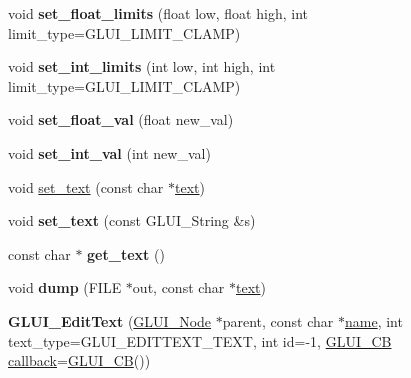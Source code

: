 \begin{DoxyCompactItemize}
\item 
\hypertarget{class_g_l_u_i___edit_text_a3b46c3540795e49983394d3bfdb89fb6}{void {\bfseries set\+\_\+float\+\_\+limits} (float low, float high, int limit\+\_\+type=G\+L\+U\+I\+\_\+\+L\+I\+M\+I\+T\+\_\+\+C\+L\+A\+M\+P)}\label{class_g_l_u_i___edit_text_a3b46c3540795e49983394d3bfdb89fb6}

\item 
\hypertarget{class_g_l_u_i___edit_text_a5761e028dc711efdc234f7211003a500}{void {\bfseries set\+\_\+int\+\_\+limits} (int low, int high, int limit\+\_\+type=G\+L\+U\+I\+\_\+\+L\+I\+M\+I\+T\+\_\+\+C\+L\+A\+M\+P)}\label{class_g_l_u_i___edit_text_a5761e028dc711efdc234f7211003a500}

\item 
\hypertarget{class_g_l_u_i___edit_text_a2c0caddce6e11b8a303c8f247b8fbf0f}{void {\bfseries set\+\_\+float\+\_\+val} (float new\+\_\+val)}\label{class_g_l_u_i___edit_text_a2c0caddce6e11b8a303c8f247b8fbf0f}

\item 
\hypertarget{class_g_l_u_i___edit_text_a230980562d1c49166c7600f1771669bd}{void {\bfseries set\+\_\+int\+\_\+val} (int new\+\_\+val)}\label{class_g_l_u_i___edit_text_a230980562d1c49166c7600f1771669bd}

\item 
void \hyperlink{class_g_l_u_i___edit_text_aa283908f42990f6056298d6381cc19a7}{set\+\_\+text} (const char $\ast$\hyperlink{class_g_l_u_i___control_af0d60e9736f4dbc34e9a536e75876d72}{text})
\item 
\hypertarget{class_g_l_u_i___edit_text_a0f60b8b2a59ecf51b145187483b8deb2}{void {\bfseries set\+\_\+text} (const G\+L\+U\+I\+\_\+\+String \&s)}\label{class_g_l_u_i___edit_text_a0f60b8b2a59ecf51b145187483b8deb2}

\item 
\hypertarget{class_g_l_u_i___edit_text_a621ba269343beeba0346439a43e5e355}{const char $\ast$ {\bfseries get\+\_\+text} ()}\label{class_g_l_u_i___edit_text_a621ba269343beeba0346439a43e5e355}

\item 
\hypertarget{class_g_l_u_i___edit_text_a8c553db0ecb0814a3db0da5bcf630d58}{void {\bfseries dump} (F\+I\+L\+E $\ast$out, const char $\ast$\hyperlink{class_g_l_u_i___control_af0d60e9736f4dbc34e9a536e75876d72}{text})}\label{class_g_l_u_i___edit_text_a8c553db0ecb0814a3db0da5bcf630d58}

\item 
\hypertarget{class_g_l_u_i___edit_text_af99784896490989539ef7638a7fd4e12}{{\bfseries G\+L\+U\+I\+\_\+\+Edit\+Text} (\hyperlink{class_g_l_u_i___node}{G\+L\+U\+I\+\_\+\+Node} $\ast$parent, const char $\ast$\hyperlink{class_g_l_u_i___control_aa95b97d50df45335fc33f0af03958eb3}{name}, int text\+\_\+type=G\+L\+U\+I\+\_\+\+E\+D\+I\+T\+T\+E\+X\+T\+\_\+\+T\+E\+X\+T, int id=-\/1, \hyperlink{class_g_l_u_i___c_b}{G\+L\+U\+I\+\_\+\+C\+B} \hyperlink{class_g_l_u_i___control_a96060fe0cc6d537e736dd6eef78e24ab}{callback}=\hyperlink{class_g_l_u_i___c_b}{G\+L\+U\+I\+\_\+\+C\+B}())}\label{class_g_l_u_i___edit_text_af99784896490989539ef7638a7fd4e12}


\end{DoxyCompactItemize}

